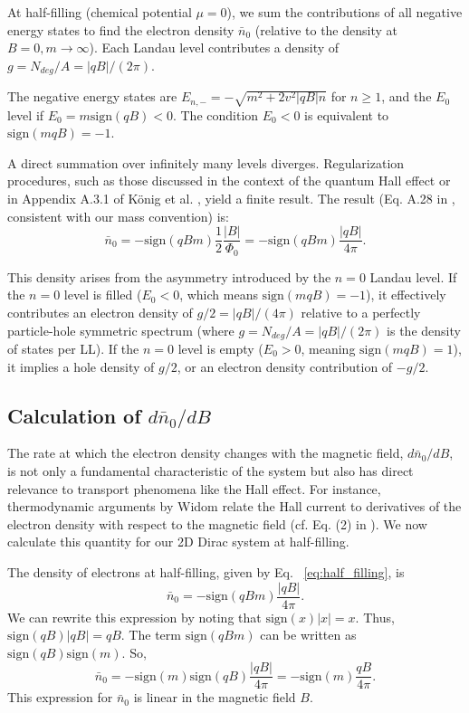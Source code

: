 \documentclass[11pt]{article}
\newcommand{\sgn}{\mathrm{sign}}
\begin{document}
At half-filling (chemical potential $\mu=0$), we sum the contributions of all negative energy states to find the electron density $\bar{n}_0$ (relative to the density at $B=0, m \to \infty$). Each Landau level contributes a density of $g = N_{deg}/A = |qB|/(2\pi)$.

The negative energy states are $E_{n,-} = -\sqrt{m^2 + 2 v^2 |qB| n}$ for $n \ge 1$, and the $E_0$ level if $E_0 = m \sgn(qB) < 0$. The condition $E_0 < 0$ is equivalent to $\sgn(m q B) = -1$.

A direct summation over infinitely many levels diverges. Regularization procedures, such as those discussed in the context of the quantum Hall effect or in Appendix A.3.1 of König et al. \cite{PhysRevB.88.035106}, yield a finite result. The result (Eq. A.28 in \cite{PhysRevB.88.035106}, consistent with our mass convention) is:
\begin{equation}
\bar{n}_0 = -\sgn(qBm) \frac{1}{2} \frac{|B|}{\Phi_0} = -\sgn(qBm) \frac{|qB|}{4\pi}.
\label{eq:half_filling}
\end{equation}

This density arises from the asymmetry introduced by the $n=0$ Landau level. If the $n=0$ level is filled ($E_0 < 0$, which means $\sgn(mqB)=-1$), it effectively contributes an electron density of $g/2 = |qB|/(4\pi)$ relative to a perfectly particle-hole symmetric spectrum (where $g = N_{deg}/A = |qB|/(2\pi)$ is the density of states per LL). If the $n=0$ level is empty ($E_0 > 0$, meaning $\sgn(mqB)=1$), it implies a hole density of $g/2$, or an electron density contribution of $-g/2$.

\subsection[Calculation of d n0/dB]{Calculation of \texorpdfstring{$d\bar{n}_0/dB$}{d n0/dB}}

The rate at which the electron density changes with the magnetic field, $d\bar{n}_0/dB$, is not only a fundamental characteristic of the system but also has direct relevance to transport phenomena like the Hall effect. For instance, thermodynamic arguments by Widom \cite{Widom1982} relate the Hall current to derivatives of the electron density with respect to the magnetic field (cf. Eq. (2) in \cite{Widom1982}). We now calculate this quantity for our 2D Dirac system at half-filling.

The density of electrons at half-filling, given by Eq. ~\ref{eq:half_filling}, is
$$ \bar{n}_0 = -\sgn(qBm) \frac{|qB|}{4\pi}. $$
We can rewrite this expression by noting that $\sgn(x)|x| = x$.
Thus, $\sgn(qB)|qB| = qB$. The term $\sgn(qBm)$ can be written as $\sgn(qB)\sgn(m)$.
So,
$$ \bar{n}_0 = -\sgn(m) \sgn(qB) \frac{|qB|}{4\pi} = -\sgn(m) \frac{qB}{4\pi}. $$
This expression for $\bar{n}_0$ is linear in the magnetic field $B$.
\end{document}
